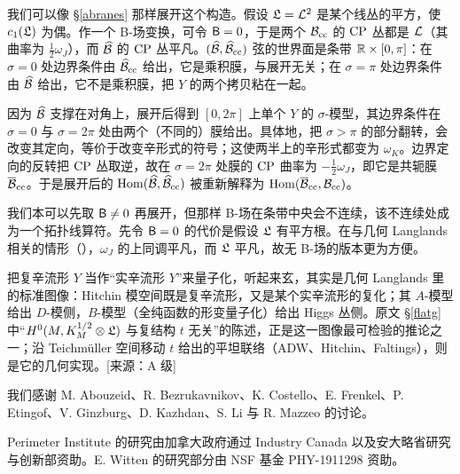 我们可以像 §\ref{abranes} 那样展开这个构造。假设 ${\mathfrak L}={\mathcal L}^2$ 是某个线丛的平方，使 $c_1({\mathfrak L})$ 为偶。作一个 B-场变换，可令 ${\sf B}=0$，于是两个 ${\mathcal B}_{\mathrm{cc}}$ 的 ${\mathrm{CP}}$ 丛都是 ${\mathcal L}$（其曲率为 $\frac12\omega_J$），而 $\widehat{{\mathcal B}}$ 的 ${\mathrm{CP}}$ 丛平凡。$(\widehat{{\mathcal B}},\widehat{{\mathcal B}}_{\mathrm{cc}})$ 弦的世界面是条带 ${\mathbb R}\times[0,\pi]$：在 $\sigma=0$ 处边界条件由 $\widehat{{\mathcal B}}_{\mathrm{cc}}$ 给出，它是乘积膜，与展开无关；在 $\sigma=\pi$ 处边界条件由 $\widehat{{\mathcal B}}$ 给出，它不是乘积膜，把 $Y$ 的两个拷贝粘在一起。

因为 $\widehat{{\mathcal B}}$ 支撑在对角上，展开后得到 $[0,2\pi]$ 上单个 $Y$ 的 $\sigma$-模型，其边界条件在 $\sigma=0$ 与 $\sigma=2\pi$ 处由两个（不同的）膜给出。具体地，把 $\sigma>\pi$ 的部分翻转，会改变其定向，等价于改变辛形式的符号；这使两半上的辛形式都变为 $\omega_K$。边界定向的反转把 ${\mathrm{CP}}$ 丛取逆，故在 $\sigma=2\pi$ 处膜的 ${\mathrm{CP}}$ 曲率为 $-\frac12\omega_J$，即它是共轭膜 $\overline{{\mathcal B}}_{\mathrm{cc}}$。于是展开后的 ${\mathrm{Hom}}(\widehat{{\mathcal B}},\widehat{{\mathcal B}}_{\mathrm{cc}})$ 被重新解释为 ${\mathrm{Hom}}(\overline{{\mathcal B}}_{\mathrm{cc}},{\mathcal B}_{\mathrm{cc}})$。

我们本可以先取 ${\sf B}\ne0$ 再展开，但那样 B-场在条带中央会不连续，该不连续处成为一个拓扑线算符。先令 ${\sf B}=0$ 的代价是假设 ${\mathfrak L}$ 有平方根。在与几何 Langlands 相关的情形（\cite{GaW}），$\omega_J$ 的上同调平凡，而 ${\mathfrak L}$ 平凡，故无 B-场的版本更为方便。

\begin{yizhu}
把复辛流形 $Y$ 当作“实辛流形 $Y$”来量子化，听起来玄，其实是几何 Langlands 里的标准图像：Hitchin 模空间既是复辛流形，又是某个实辛流形的复化；其 $A$-模型给出 $D$-模侧，$B$-模型（全纯函数的形变量子化）给出 Higgs 丛侧。原文 §\ref{flatg} 中“$H^0(M,K_M^{1/2}\otimes{\mathfrak L})$ 与复结构 $t$ 无关”的陈述，正是这一图像最可检验的推论之一；沿 Teichmüller 空间移动 $t$ 给出的平坦联络（ADW、Hitchin、Faltings），则是它的几何实现。[来源：A 级]
\end{yizhu}

\medskip
{}\quad
我们感谢 M. Abouzeid、R. Bezrukavnikov、K. Costello、E. Frenkel、P. Etingof、V. Ginzburg、D. Kazhdan、S. Li 与 R. Mazzeo 的讨论。

Perimeter Institute 的研究由加拿大政府通过 Industry Canada 以及安大略省研究与创新部资助。E. Witten 的研究部分由 NSF 基金 PHY-1911298 资助。

